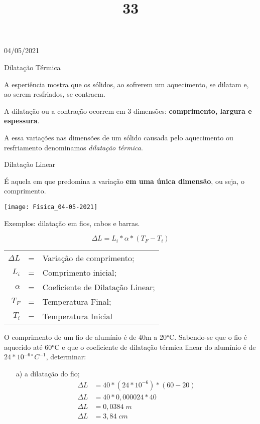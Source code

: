 \documentclass{SchoolBook}
\begin{document}
    \begin{day}{04/05/2021}
        \title{3}{Dilatação Térmica}
        
        A esperiência mostra que os sólidos, ao sofrerem um aquecimento, se dilatam e, ao serem resfriados, se contraem.
        
        A dilatação ou a contração ocorrem em 3 dimensões: \textbf{comprimento, largura e espessura}.
        
        A essa variações nas dimensões de um sólido causada pelo aquecimento ou resfriamento denominamos \emph{dilatação térmica}. 
        
        \title{3}{Dilatação Linear}
        
        É aquela em que predomina a variação \textbf{em uma única dimensão}, ou seja, o comprimento.
        
        \begin{center}
            \texttt{[image: Física\_04-05-2021]}
        \end{center}
        
        Exemplos: dilatação em fios, cabos e barras.
        
        $$ \Delta L = L_i * \alpha * ( T_F - T_i ) $$
        
        \vspace{6pt}
        \begin{tabular}{ r c l }
            $ \Delta L $ &=& Variação de comprimento;         \\
                 $ L_i $ &=& Comprimento inicial;             \\
              $ \alpha $ &=& Coeficiente de Dilatação Linear; \\
                 $ T_F $ &=& Temperatura Final;               \\
                 $ T_i $ &=& Temperatura Inicial
        \end{tabular}
        
        \vspace{6pt}
        
        O comprimento de um fio de alumínio é de 40m a 20°C. Sabendo-se que o fio é aquecido até 60°C e que o coeficiente de dilatação térmica linear do alumínio é de $24 * 10^{-6\circ} C^{-1}$, determinar:
        
        \begin{enumerate}
            \item[a)] a dilatação do fio;
            \begin{align*}
                \Delta L &= 40 * (24 * 10^{-6}) * (60 - 20) \\
                \Delta L &= 40 * 0,000024 * 40              \\
                \Delta L &= 0,0384\;m                       \\
                \Delta L &= 3,84\;cm            
            \end{align*}
            

\end{enumerate}
\end{day}
\end{document}
